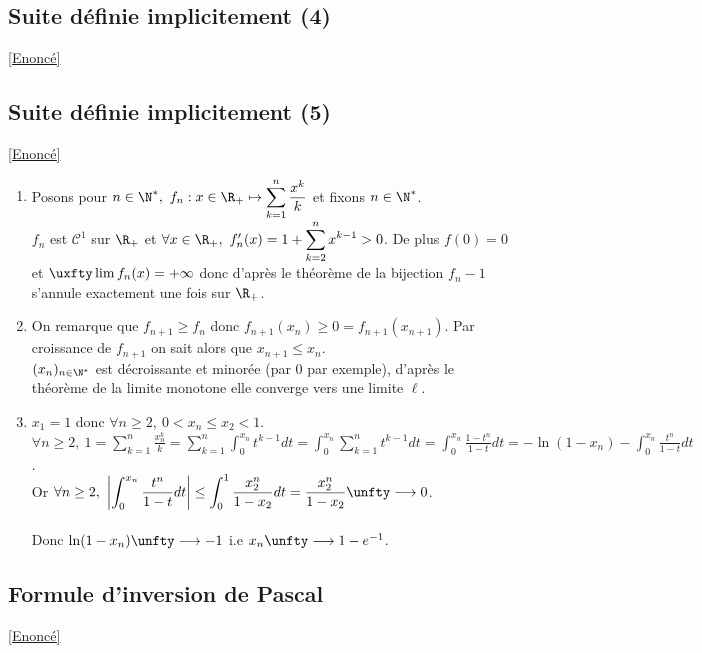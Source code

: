 \documentclass{book}
\begin{document}
	\subsection{Suite définie implicitement (4)}\label{sec:suite-definie-implicitement-4}
	\textcolor{blue}{\hyperref[Suite définie implicitement 4]{[Enoncé]}}\\	
	
	\subsection{Suite définie implicitement (5) }\label{sec:suite-definie-implicitement-5-etoile3}
		\textcolor{blue}{\hyperref[Suite définie implicitement 5]{[Enoncé]}}\\
	\begin{enumerate}[leftmargin=*]
		\item Posons pour $n\in \N^*,\ f_n:x\in \R_+\mapsto \displaystyle\sum_{k=1}^n\frac{x^k}{k}$ et fixons $n\in \N^*$.\\
		$f_n$ est $\mathcal C^1$ sur $\R_+$ et $\forall x\in \R_+,\ f_n'(x)=\displaystyle1+\sum_{k=2}^nx^{k-1}>0$. De plus $f(0)=0$ et $\uxfty\lim f_n(x)=+\infty$ donc d'après le théorème de la bijection $f_n-1$ s'annule exactement une fois sur $\R_+$.
		\item On remarque que $f_{n+1}\geq f_n$ donc $f_{n+1}(x_n)\geq 0=f_{n+1}(x_{n+1})$. Par croissance de $f_{n+1}$ on sait alors que $x_{n+1}\leq x_n$.\\
		$(x_n)_{n\in \N^*}$ est décroissante et minorée (par $0$ par exemple), d'après le théorème de la limite monotone elle converge vers une limite $\ell$.
		\item $x_1=1$ donc $\forall n\geq 2,\ 0<x_n\leq x_2<1$.\\
		$\forall n\geq 2,\ 1=\displaystyle\sum_{k=1}^n\frac{x_n^k}{k}=\sum_{k=1}^n\int_0^{x_n}t^{k-1}dt=\int_0^{x_n}\sum_{k=1}^nt^{k-1}dt=\int_0^{x_n}\frac{1-t^n}{1-t}dt=-\ln(1-x_n)-\int_0^{x_n}\frac{t^n}{1-t}dt$.\\
		Or $\forall n\geq 2,\ \displaystyle\left|\int_0^{x_n}\frac{t^n}{1-t}dt\right|\leq \int_0^1\frac{x_2^n}{1-x_2}dt=\frac{x_2^n}{1-x_2}\unfty\longrightarrow 0$.\\\\
		Donc $\ln(1-x_n)\unfty\longrightarrow -1$ i.e $x_n\unfty\longrightarrow1-e^{-1}$.
	\end{enumerate}
	
	
	\subsection{Formule d'inversion de Pascal }\label{sec:formule-dinversion-de-pascal-etoile2}
		\textcolor{blue}{\hyperref[Formule d'inversion de Pascal]{[Enoncé]}}\\
\end{document}
